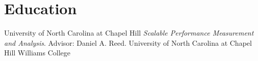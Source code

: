 \section{Education}
		{University of North Carolina at Chapel Hill}{}{}
		{%
		  \textit{Scalable Performance Measurement and Analysis}. Advisor: Daniel A. Reed.
		}
		{University of North Carolina at Chapel Hill}{}{}{}
		{Williams College}{}{}{}
